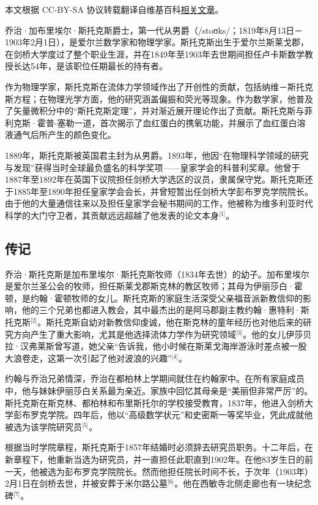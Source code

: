 
本文根据 CC-BY-SA 协议转载翻译自维基百科\href{https://en.wikipedia.org/wiki/Sir_George_Stokes,_1st_Baronet}{相关文章}。


乔治·加布里埃尔·斯托克斯爵士，第一代从男爵（/stoʊks/；1819年8月13日－1903年2月1日），是爱尔兰数学家和物理学家。斯托克斯出生于爱尔兰斯莱戈郡，在剑桥大学度过了整个职业生涯，并在1849年至1903年去世期间担任卢卡斯数学教授长达54年，是该职位任期最长的持有者。

作为物理学家，斯托克斯在流体力学领域作出了开创性的贡献，包括纳维－斯托克斯方程；在物理光学方面，他的研究涵盖偏振和荧光等现象。作为数学家，他普及了矢量微积分中的“斯托克斯定理”，并对渐近展开理论作出了贡献。斯托克斯与菲利克斯·霍普-塞勒一道，首次揭示了血红蛋白的携氧功能，并展示了血红蛋白溶液通气后所产生的颜色变化。

1889年，斯托克斯被英国君主封为从男爵。1893年，他因“在物理科学领域的研究与发现”获得当时全球最负盛名的科学奖项——皇家学会的科普利奖章。他曾于1887年至1892年在英国下议院担任剑桥大学选区的议员，隶属保守党。斯托克斯还于1885年至1890年担任皇家学会会长，并曾短暂出任剑桥大学彭布罗克学院院长。由于他的大量通信往来以及担任皇家学会秘书期间的工作，他被称为维多利亚时代科学的大门守卫者，其贡献远远超越了他发表的论文本身\(^\text{[1]}\)。
\subsection{传记}
乔治·斯托克斯是加布里埃尔·斯托克斯牧师（1834年去世）的幼子。加布里埃尔是爱尔兰圣公会的牧师，担任斯莱戈郡斯克林的教区牧师；其母为伊丽莎白·霍顿，是约翰·霍顿牧师的女儿。斯托克斯的家庭生活深受父亲福音派新教信仰的影响，他的三个兄弟也都进入教会，其中最杰出的是阿马郡副主教约翰·惠特利·斯托克斯\(^\text{[2]}\)。斯托克斯自幼对新教信仰虔诚，他在斯克林的童年经历也对他后来的研究方向产生了重大影响，尤其是他选择流体力学作为研究领域\(^\text{[3]}\)。他的女儿伊莎贝拉·汉弗莱斯曾写道，她父亲“告诉我，他小时候在斯莱戈海岸游泳时差点被一股大浪卷走，这第一次引起了他对波浪的兴趣”\(^\text{[4]}\)。

约翰与乔治兄弟情深，乔治在都柏林上学期间就住在约翰家中。在所有家庭成员中，他与妹妹伊丽莎白关系最为亲近。家族中回忆其母亲是“美丽但非常严厉”的。斯托克斯在斯克林、都柏林和布里斯托尔的学校接受教育，1837年，他进入剑桥大学彭布罗克学院。四年后，他以“高级数学状元”和史密斯一等奖毕业，凭此成就他被选为该学院研究员\(^\text{[5]}\)。

根据当时学院章程，斯托克斯于1857年结婚时必须辞去研究员职务。十二年后，在新章程下，他重新当选为研究员，并一直担任此职直到1902年。在他83岁生日的前一天，他被选为彭布罗克学院院长。然而他担任院长时间不长，于次年（1903年）2月1日在剑桥去世，并被安葬于米尔路公墓\(^\text{[6]}\)。他在西敏寺北侧走廊也有一块纪念碑\(^\text{[7]}\)。
